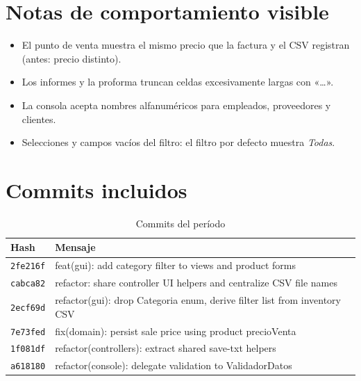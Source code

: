 \section{Notas de comportamiento visible}
\begin{itemize}
\item El punto de venta muestra el mismo precio que la factura y el CSV registran (antes: precio distinto).
\item Los informes y la proforma truncan celdas excesivamente largas con «…».
\item La consola acepta nombres alfanuméricos para empleados, proveedores y clientes.
\item Selecciones y campos vacíos del filtro: el filtro por defecto muestra \emph{Todas}.
\end{itemize}

\section{Commits incluidos}
\begin{table}[H]\centering\caption{Commits del período}
\begin{tabular}{l p{}}\toprule
Hash & Mensaje\\\midrule
\texttt{2fe216f} & feat(gui): add category filter to views and product forms\\
\texttt{cabca82} & refactor: share controller UI helpers and centralize CSV file names\\
\texttt{2ecf69d} & refactor(gui): drop Categoria enum, derive filter list from inventory CSV\\
\texttt{7e73fed} & fix(domain): persist sale price using product precioVenta\\
\texttt{1f081df} & refactor(controllers): extract shared save-txt helpers\\
\texttt{a618180} & refactor(console): delegate validation to ValidadorDatos\\\bottomrule
\end{tabular}\end{table}
